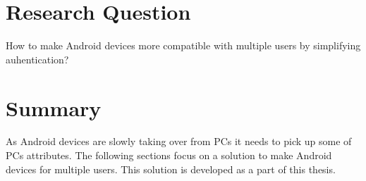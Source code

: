 \section{Research Question}
How to make Android devices more compatible with multiple users by simplifying auhentication?




\section{Summary}
As Android devices are slowly taking over from PCs it needs to pick up some of PCs attributes. The following sections focus on a solution to make Android devices for multiple users. This solution is developed as a part of this thesis.




